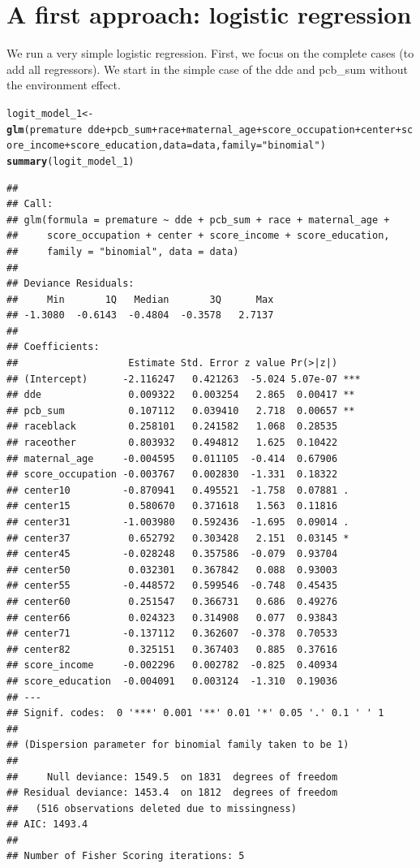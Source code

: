 \documentclass{article}\usepackage[]{graphicx}\usepackage[]{color}
\makeatletter
\newcommand{\hlstr}[1]{\textcolor[rgb]{0.192,0.494,0.8}{#1}}%
\newcommand{\hlopt}[1]{\textcolor[rgb]{0,0,0}{#1}}%
\newcommand{\hlstd}[1]{\textcolor[rgb]{0.345,0.345,0.345}{#1}}%
\newcommand{\hlkwb}[1]{\textcolor[rgb]{0.69,0.353,0.396}{#1}}%
\newcommand{\hlkwc}[1]{\textcolor[rgb]{0.333,0.667,0.333}{#1}}%
\newcommand{\hlkwd}[1]{\textcolor[rgb]{0.737,0.353,0.396}{\textbf{#1}}}%
\newenvironment{kframe}{%
 \def\at@end@of@kframe{}%
 \ifinner\ifhmode%
  \def\at@end@of@kframe{\end{minipage}}%
  \begin{minipage}{\columnwidth}%
 \fi\fi%
 \def\FrameCommand##1{\hskip\@totalleftmargin \hskip-\fboxsep
 \colorbox{shadecolor}{##1}\hskip-\fboxsep
     \hskip-\linewidth \hskip-\@totalleftmargin \hskip\columnwidth}%
 \MakeFramed {\advance\hsize-\width
   \@totalleftmargin\z@ \linewidth\hsize
   \@setminipage}}%
 {\par\unskip\endMakeFramed%
 \at@end@of@kframe}
\newenvironment{knitrout}{}{} %
\makeatother
\begin{document}
\section{A first approach: logistic regression}
We run a very simple logistic regression. First, we focus on the complete cases (to add all regressors). We start in the simple case of the dde and pcb_sum without the environment effect.
\begin{knitrout}
\color{fgcolor}\begin{kframe}
\begin{alltt}
\hlstd{logit_model_1} \hlkwb{<-} \hlkwd{glm}\hlstd{(premature} \hlopt{~} \hlstd{dde} \hlopt{+} \hlstd{pcb_sum} \hlopt{+} \hlstd{race} \hlopt{+} \hlstd{maternal_age} \hlopt{+} \hlstd{score_occupation} \hlopt{+} \hlstd{center} \hlopt{+} \hlstd{score_income} \hlopt{+} \hlstd{score_education,} \hlkwc{data} \hlstd{= data,} \hlkwc{family} \hlstd{=} \hlstr{"binomial"}\hlstd{)}
\hlkwd{summary}\hlstd{(logit_model_1)}
\end{alltt}
\begin{verbatim}
## 
## Call:
## glm(formula = premature ~ dde + pcb_sum + race + maternal_age + 
##     score_occupation + center + score_income + score_education, 
##     family = "binomial", data = data)
## 
## Deviance Residuals: 
##     Min       1Q   Median       3Q      Max  
## -1.3080  -0.6143  -0.4804  -0.3578   2.7137  
## 
## Coefficients:
##                   Estimate Std. Error z value Pr(>|z|)    
## (Intercept)      -2.116247   0.421263  -5.024 5.07e-07 ***
## dde               0.009322   0.003254   2.865  0.00417 ** 
## pcb_sum           0.107112   0.039410   2.718  0.00657 ** 
## raceblack         0.258101   0.241582   1.068  0.28535    
## raceother         0.803932   0.494812   1.625  0.10422    
## maternal_age     -0.004595   0.011105  -0.414  0.67906    
## score_occupation -0.003767   0.002830  -1.331  0.18322    
## center10         -0.870941   0.495521  -1.758  0.07881 .  
## center15          0.580670   0.371618   1.563  0.11816    
## center31         -1.003980   0.592436  -1.695  0.09014 .  
## center37          0.652792   0.303428   2.151  0.03145 *  
## center45         -0.028248   0.357586  -0.079  0.93704    
## center50          0.032301   0.367842   0.088  0.93003    
## center55         -0.448572   0.599546  -0.748  0.45435    
## center60          0.251547   0.366731   0.686  0.49276    
## center66          0.024323   0.314908   0.077  0.93843    
## center71         -0.137112   0.362607  -0.378  0.70533    
## center82          0.325151   0.367403   0.885  0.37616    
## score_income     -0.002296   0.002782  -0.825  0.40934    
## score_education  -0.004091   0.003124  -1.310  0.19036    
## ---
## Signif. codes:  0 '***' 0.001 '**' 0.01 '*' 0.05 '.' 0.1 ' ' 1
## 
## (Dispersion parameter for binomial family taken to be 1)
## 
##     Null deviance: 1549.5  on 1831  degrees of freedom
## Residual deviance: 1453.4  on 1812  degrees of freedom
##   (516 observations deleted due to missingness)
## AIC: 1493.4
## 
## Number of Fisher Scoring iterations: 5
\end{verbatim}
\end{kframe}
\end{knitrout}
\end{document}
